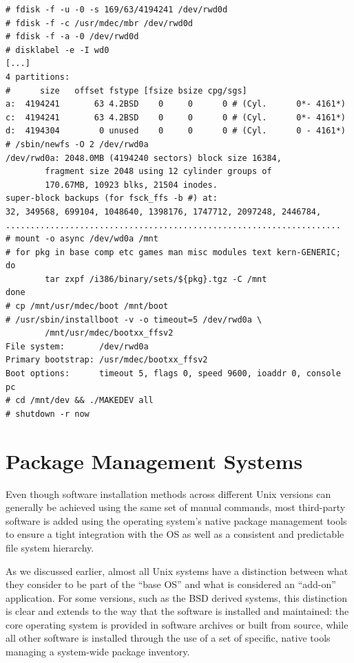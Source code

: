 \begin{lstlisting}[float,basicstyle=\scriptsize,label=code:netbsd-install,caption={[Commands
used during the installation of NetBSD]Manual
installation of NetBSD using the \manpage{fdisk(8)},
\manpage{disklabel(8)}, \manpage{newfs(8)}, and
\manpage{installboot(8)} commands.}]
# fdisk -f -u -0 -s 169/63/4194241 /dev/rwd0d
# fdisk -f -c /usr/mdec/mbr /dev/rwd0d
# fdisk -f -a -0 /dev/rwd0d
# disklabel -e -I wd0
[...]
4 partitions:
#      size   offset fstype [fsize bsize cpg/sgs]
a:  4194241       63 4.2BSD    0     0      0 # (Cyl.      0*- 4161*)
c:  4194241       63 4.2BSD    0     0      0 # (Cyl.      0*- 4161*)
d:  4194304        0 unused    0     0      0 # (Cyl.      0 - 4161*)
# /sbin/newfs -O 2 /dev/rwd0a
/dev/rwd0a: 2048.0MB (4194240 sectors) block size 16384,
        fragment size 2048 using 12 cylinder groups of
        170.67MB, 10923 blks, 21504 inodes.
super-block backups (for fsck_ffs -b #) at:
32, 349568, 699104, 1048640, 1398176, 1747712, 2097248, 2446784,
....................................................................
# mount -o async /dev/wd0a /mnt
# for pkg in base comp etc games man misc modules text kern-GENERIC; do
        tar zxpf /i386/binary/sets/${pkg}.tgz -C /mnt
done
# cp /mnt/usr/mdec/boot /mnt/boot
# /usr/sbin/installboot -v -o timeout=5 /dev/rwd0a \
        /mnt/usr/mdec/bootxx_ffsv2
File system:       /dev/rwd0a
Primary bootstrap: /usr/mdec/bootxx_ffsv2
Boot options:      timeout 5, flags 0, speed 9600, ioaddr 0, console pc
# cd /mnt/dev && ./MAKEDEV all
# shutdown -r now
\end{lstlisting}


\section{Package Management Systems}
\label{software-installation:package-management}

Even though software installation methods across
different Unix versions can generally be achieved
using the same set of manual commands, most
third-party software is added using the operating
system's native package management tools to ensure a
tight integration with the OS as well as a consistent
and predictable file system hierarchy.

As we discussed earlier, almost all Unix systems have
a distinction between what they consider to be part of
the ``base OS'' and what is considered an ``add-on''
application.  For some versions, such as the BSD
derived systems, this distinction is clear and extends
to the way that the software is installed and
maintained:  the core operating system is provided in
software archives or built from source, while all
other software is installed through the use of a set
of specific, native tools managing a system-wide
package inventory.

